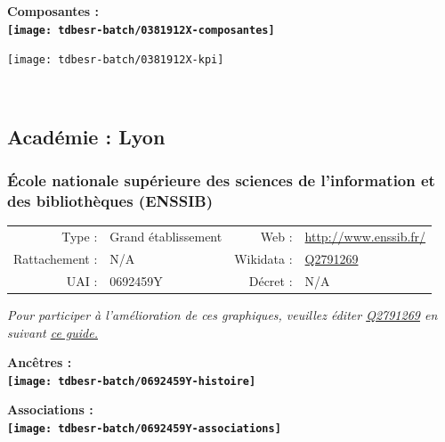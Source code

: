 \documentclass[12pt,french,]{article}
\begin{document}
\hrulefill

\begin{center} \bf Composantes : \\  
\texttt{[image: tdbesr-batch/0381912X-composantes]} \end{center}

\begin{center}\texttt{[image: tdbesr-batch/0381912X-kpi]} \end{center}\checkoddpage

\ifoddpage ~\newpage \fi   

\hypertarget{acaduxe9mie-lyon-1}{%
\subsection{Académie : Lyon}\label{acaduxe9mie-lyon-1}}

\hypertarget{uxe9cole-nationale-supuxe9rieure-des-sciences-de-linformation-et-des-bibliothuxe8ques-enssib}{%
\subsubsection{École nationale supérieure des sciences de l'information
et des bibliothèques
(ENSSIB)}\label{uxe9cole-nationale-supuxe9rieure-des-sciences-de-linformation-et-des-bibliothuxe8ques-enssib}}

\begin{tabular*}{\textwidth}{rp{5cm}rl}  
\hline  
Type : & Grand établissement & Web : &\href{http://www.enssib.fr/}{http://www.enssib.fr/} \\  
Rattachement : & N/A & Wikidata : & \href{https://www.wikidata.org/entity/Q2791269}{Q2791269} \\  
UAI : & 0692459Y & Décret : & N/A \\  
\hline  
\end{tabular*}

\textit{\scriptsize Pour participer à l'amélioration de ces graphiques, veuillez éditer  \href{https://www.wikidata.org/entity/Q2791269}{Q2791269}  en suivant \href{https://github.com/cpesr/wikidataESR/blob/master/Rmd/wikidataESR.md}{ce guide.}}

\vspace{1cm}  
\begin{minipage}[b]{0.50\textwidth}\begin{center} \bf Ancêtres : \\  
\texttt{[image: tdbesr-batch/0692459Y-histoire]} \end{center}\end{minipage}\begin{minipage}[b]{0.50\textwidth}\begin{center} \bf Associations : \\  
\texttt{[image: tdbesr-batch/0692459Y-associations]} \end{center}\end{minipage}
\end{document}
